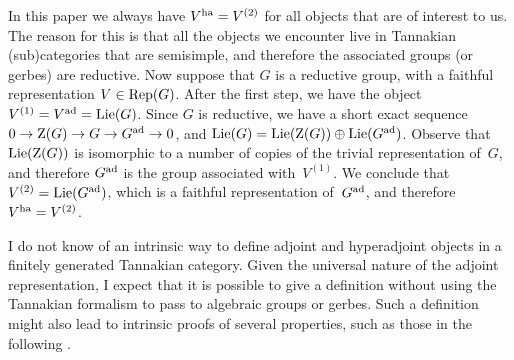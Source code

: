 \documentclass[10pt,twoside,leqno]{article}
\numberwithin{equation}{subsection}
\newcommand{\Rep}{\textnormal{Rep}}
\newcommand{\Lie}{\textnormal{Lie}}
\newcommand{\ad}{\textnormal{ad}}
\newcommand{\ha}{\textnormal{ha}}
\newcommand{\Zentrum}{\textnormal{Z}}
\begin{document}
\begin{remark} %
 In this paper we always have $V^\ha = V^{(2)}$
 for all objects that are of interest to us.
 The reason for this is that all the objects we encounter live in
 Tannakian (sub)categories that are semisimple,
 and therefore the associated groups (or gerbes) are reductive.
 Now suppose that $G$ is a reductive group,
 with a faithful representation $V \in \Rep(G)$.
 After the first step, we have the object $V^{(1)} = V^\ad = \Lie(G)$.
 Since $G$ is reductive, we have a short exact sequence
 $0 \to \Zentrum(G) \to G \to G^\ad \to 0$,
 and $\Lie(G) = \Lie(\Zentrum(G)) \oplus \Lie(G^\ad)$.
 Observe that $\Lie(\Zentrum(G))$ is isomorphic
 to a number of copies of the trivial representation of~$G$,
 and therefore $G^\ad$ is the group associated with~$V^{(1)}$.
 We conclude that $V^{(2)} = \Lie(G^\ad)$,
 which is a faithful representation of~$G^\ad$,
 and therefore $V^\ha = V^{(2)}$.
\end{remark}

\begin{remark} %
 I do not know of an intrinsic way to define
 adjoint and hyperadjoint objects in a finitely generated Tannakian category.
 Given the universal nature of the adjoint representation,
 I expect that it is possible to give a definition
 without using the Tannakian formalism to pass to algebraic groups or gerbes.
 Such a definition might also lead to intrinsic proofs of several properties,
 such as those in the following .
\end{remark}
\end{document}
